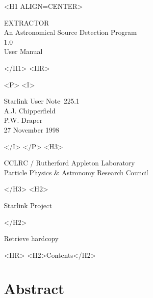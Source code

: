 \documentclass[twoside,11pt]{article}
\newcommand{\stardoccategory}  {Starlink User Note}
\newcommand{\stardocsource}    {sun\stardocnumber}
\newcommand{\stardocnumber}    {225.1}
\newcommand{\stardocauthors}   {A.J. Chipperfield\\
                                P.W. Draper}
\newcommand{\stardocdate}      {27 November 1998}
\newcommand{\stardoctitle}     {EXTRACTOR\\
                                An Astronomical Source Detection Program}
\newcommand{\stardocversion}   {1.0}
\newcommand{\stardocmanual}    {User Manual}
\newcommand{\htmladdnormallink}[2]{#1}
\newcommand{\htmladdimg}[1]{}
\newcommand{\htmlref}[2]{#1}
\newcommand{\htmladdtonavigation}[1]{}
\newcommand{\xlabel}[1]{}
\renewcommand{\_}{\texttt{\symbol{95}}}
\begin{document}
\begin{htmlonly}
   \xlabel{}
   \begin{rawhtml} <H1 ALIGN=CENTER> \end{rawhtml}
      \stardoctitle\\
      \stardocversion\\
      \stardocmanual
   \begin{rawhtml} </H1> <HR> \end{rawhtml}


   \begin{rawhtml} <P> <I> \end{rawhtml}
   \stardoccategory\ \stardocnumber \\
   \stardocauthors \\
   \stardocdate
   \begin{rawhtml} </I> </P> <H3> \end{rawhtml}
      \htmladdnormallink{CCLRC}{http://www.cclrc.ac.uk} /
      \htmladdnormallink{Rutherford Appleton Laboratory}
                        {http://www.cclrc.ac.uk/ral} \\
      \htmladdnormallink{Particle Physics \& Astronomy Research Council}
                        {http://www.pparc.ac.uk} \\
   \begin{rawhtml} </H3> <H2> \end{rawhtml}
      \htmladdnormallink{Starlink Project}{http://star-www.rl.ac.uk/}
   \begin{rawhtml} </H2> \end{rawhtml}
   \htmladdnormallink{\htmladdimg{source.gif} Retrieve hardcopy}
      {http://star-www.rl.ac.uk/cgi-bin/hcserver?\stardocsource}\\

  \label{stardoccontents}
  \begin{rawhtml} 
    <HR>
    <H2>Contents</H2>
  \end{rawhtml}
  \htmladdtonavigation{\htmlref{\htmladdimg{contents_motif.gif}}
        {stardoccontents}}

  \section{\xlabel{abstract}Abstract}
\end{htmlonly}
\end{document}
